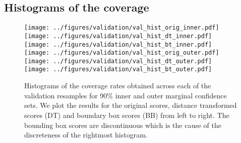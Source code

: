 \newpage
\subsection{Histograms of the coverage}
\begin{figure}[h!]
	\begin{center}
		\texttt{[image: ../figures/validation/val\_hist\_orig\_inner.pdf]}
		\texttt{[image: ../figures/validation/val\_hist\_dt\_inner.pdf]}
		\texttt{[image: ../figures/validation/val\_hist\_bt\_inner.pdf]}\\
		\texttt{[image: ../figures/validation/val\_hist\_orig\_outer.pdf]}
		\texttt{[image: ../figures/validation/val\_hist\_dt\_outer.pdf]}
		\texttt{[image: ../figures/validation/val\_hist\_bt\_outer.pdf]}
	\end{center}
	\caption{Histograms of the coverage rates obtained across each of the validation resamples for 90\% inner and outer marginal confidence sets. We plot the results for the original scores, distance transformed scores (DT) and boundary box scores (BB) from left to right. The bounding box scores are discontinuous which is the cause of the discreteness of the rightmost histogram.}\label{fig:valhist}
\end{figure}

